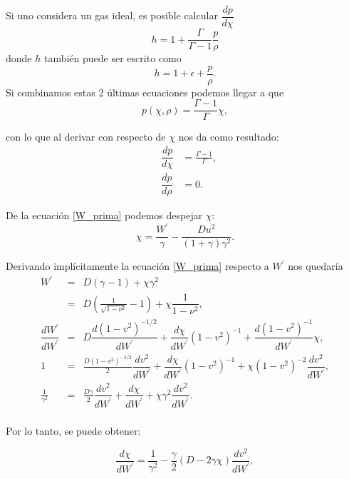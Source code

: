 \documentclass[12pt,a4paper]{book}
\begin{document}
\noindent Si uno considera un gas ideal, es posible calcular $\dfrac{dp}{d\chi}$
\begin{equation} \label{entalpía_función_presion_densidad}
h=1+\frac{\Gamma}{\Gamma-1}\frac{p}{\rho}
\end{equation}
donde $h$ también puede ser escrito como
\begin{equation}
h=1+\epsilon+\frac{p}{\rho}.
\end{equation}
Si combinamos estas 2 últimas ecuaciones podemos llegar a que 
\begin{equation}
p(\chi,\rho)=\frac{\Gamma-1}{\Gamma}\chi ,
\end{equation}

\noindent con lo que al derivar con respecto de $\chi$ nos da como resultado:
\begin{eqnarray}\label{der_presion}
& \dfrac{d p}{d \chi}&=\frac{\Gamma-1}{\Gamma} ,\\ &\dfrac{d p}{d \rho}&= 0.
\end{eqnarray}

\noindent De la ecuación \ref{W_prima} podemos despejar $\chi$:
\begin{equation}
\chi=\frac{W^{'}}{\gamma}- \frac{D u^{2}}{(1+\gamma)\gamma^{2}}.
\end{equation}

\noindent Derivando implícitamente la ecuación \ref{W_prima} respecto a $W^{'}$ nos quedaría
\begin{eqnarray*}
W^{'}&=&D\left(\gamma-1 \right) + \chi \gamma^{2}\\%
&=& D\left(\frac{1}{\sqrt{1-\nu^{2}}} -1\right)+\chi \dfrac{1}{1-\nu^{2}}, \\%
\dfrac{d W^{'}}{d W^{'}} &=& D \dfrac{d (1-v^2)^{-1/2}}{d W^{'}}+\dfrac{d \chi}{dW^{'}}(1-v^2)^{-1}+\dfrac{d (1-v^2)^{-1} }{d W^{'}}\chi, \\  %
1 &=& \frac{D(1-v^2)^{-3/2}}{2} \dfrac{d v^{2}}{d W^{'}}+\dfrac{d \chi}{dW^{'}}(1-v^2)^{-1}+ \chi (1-v^2)^{-2}  \dfrac{d v^{2}}{d W^{'}}, \\ %
\frac{1}{\gamma ^2} &=& \frac{D \gamma}{2} \dfrac{d v^{2}}{d W^{'}} + \dfrac{d \chi}{dW^{'}} + \chi \gamma^2 \dfrac{d v^2}{dW^{'}}. \\ %
\end{eqnarray*}

\noindent Por lo tanto, se puede obtener:

\begin{equation}\label{der_chi}
\dfrac{d \chi}{dW^{'}}=\frac{1}{\gamma^2}-\frac{\gamma}{2}(D-2\gamma \chi) \dfrac{d v^2}{dW^{'}},
\end{equation}
\end{document}
